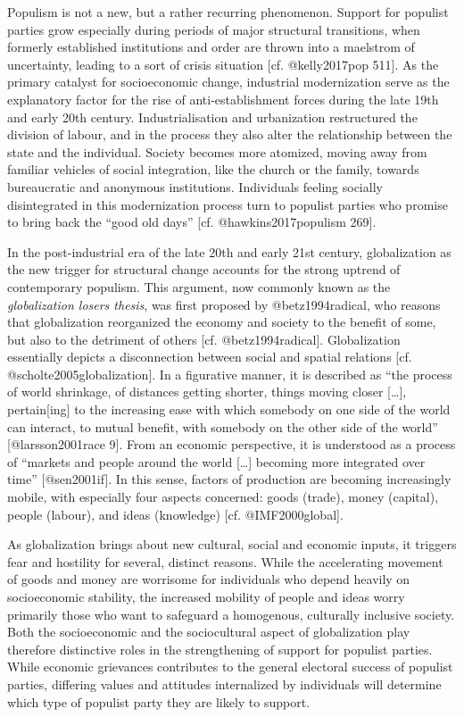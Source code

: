 \documentclass[]{article}
\begin{document}
Populism is not a new, but a rather recurring phenomenon. Support for
populist parties grow especially during periods of major structural
transitions, when formerly established institutions and order are thrown
into a maelstrom of uncertainty, leading to a sort of crisis situation
{[}cf. @kelly2017pop 511{]}. As the primary catalyst for socioeconomic
change, industrial modernization serve as the explanatory factor for the
rise of anti-establishment forces during the late 19th and early 20th
century. Industrialisation and urbanization restructured the division of
labour, and in the process they also alter the relationship between the
state and the individual. Society becomes more atomized, moving away
from familiar vehicles of social integration, like the church or the
family, towards bureaucratic and anonymous institutions. Individuals
feeling socially disintegrated in this modernization process turn to
populist parties who promise to bring back the ``good old days'' {[}cf.
@hawkins2017populism 269{]}.

In the post-industrial era of the late 20th and early 21st century,
globalization as the new trigger for structural change accounts for the
strong uptrend of contemporary populism. This argument, now commonly
known as the \emph{globalization losers thesis}, was first proposed by
@betz1994radical, who reasons that globalization reorganized the economy
and society to the benefit of some, but also to the detriment of others
{[}cf. @betz1994radical{]}. Globalization essentially depicts a
disconnection between social and spatial relations {[}cf.
@scholte2005globalization{]}. In a figurative manner, it is described as
``the process of world shrinkage, of distances getting shorter, things
moving closer {[}\ldots{}{]}, pertain{[}ing{]} to the increasing ease
with which somebody on one side of the world can interact, to mutual
benefit, with somebody on the other side of the world''
{[}@larsson2001race 9{]}. From an economic perspective, it is understood
as a process of ``markets and people around the world {[}\ldots{}{]}
becoming more integrated over time'' {[}@sen2001if{]}. In this sense,
factors of production are becoming increasingly mobile, with especially
four aspects concerned: goods (trade), money (capital), people (labour),
and ideas (knowledge) {[}cf. @IMF2000global{]}.

As globalization brings about new cultural, social and economic inputs,
it triggers fear and hostility for several, distinct reasons. While the
accelerating movement of goods and money are worrisome for individuals
who depend heavily on socioeconomic stability, the increased mobility of
people and ideas worry primarily those who want to safeguard a
homogenous, culturally inclusive society. Both the socioeconomic and the
sociocultural aspect of globalization play therefore distinctive roles
in the strengthening of support for populist parties. While economic
grievances contributes to the general electoral success of populist
parties, differing values and attitudes internalized by individuals will
determine which type of populist party they are likely to support.
\end{document}
